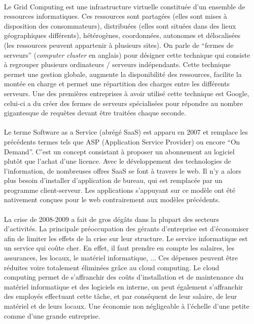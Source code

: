 \documentclass[a4paper,12pt]{report}
\begin{document}
\begin{onehalfspace}
	\paragraph*{}
	Le Grid Computing est une infrastructure virtuelle constituée d’un ensemble de ressources informatiques. Ces ressources sont partagées (elles sont mises à disposition des consommateurs), distribuées (elles sont situées dans des lieux géographiques différents), hétérogènes, coordonnées, autonomes et délocalisées (les ressources peuvent appartenir à plusieurs sites). On parle de “fermes de serveurs” (\textit{computer cluster} en anglais) pour désigner cette technique qui consiste à regrouper plusieurs ordinateurs / serveurs indépendants. Cette technique permet une gestion globale, augmente la disponibilité des ressources, facilite la montée en charge et permet une répartition des charges entre les différents serveurs.
	Une des premières entreprises à avoir utilisé cette technique est Google, celui-ci a du créer des fermes de serveurs spécialisées pour répondre au nombre gigantesque de requêtes devant être traitées chaque seconde.
	
	\paragraph*{}
	Le terme Software as a Service (abrégé SaaS) est apparu en 2007 et remplace les précédents termes tels que ASP (Application Service Provider) ou encore “On Demand”.
	C’est un concept consistant à proposer un abonnement au logiciel plutôt que l’achat d’une licence. Avec le développement des technologies de l’information, de nombreuses offres SaaS se font à travers le web. Il n’y a alors plus besoin d’installer d’application de bureau, qui est remplacée par un programme client-serveur.
	Les applications s’appuyant sur ce modèle ont été nativement conçues pour le web contrairement aux modèles précédents.
	
	\paragraph*{}
	La crise de 2008-2009 a fait de gros dégâts dans la plupart des secteurs d’activités. La principale préoccupation des gérants d’entreprise est d’économiser afin de limiter les effets de la crise sur leur structure. Le service informatique est un service qui coûte cher. En effet, il faut prendre en compte les salaires, les assurances, les locaux, le matériel informatique, ... Ces dépenses peuvent être réduites voire totalement éliminées grâce au cloud computing. Le cloud computing permet de s'affranchir des coûts d'installation et de maintenance du matériel informatique et des logiciels en interne, on peut également s'affranchir des employés effectuant cette tâche, et par conséquent de leur salaire, de leur matériel et de leurs locaux. Une économie non négligeable à l'échelle d'une petite comme d'une grande entreprise.


\end{onehalfspace}
\end{document}
